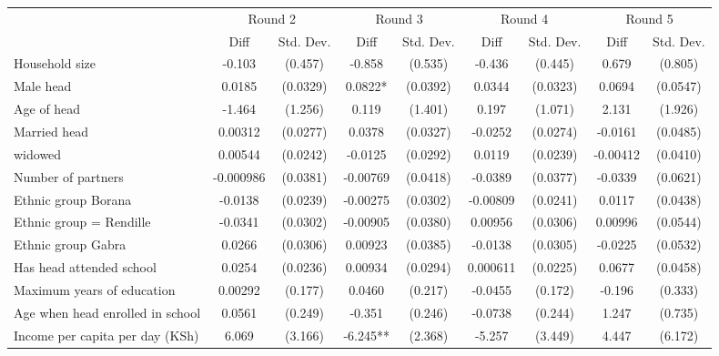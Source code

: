 \begin{tabular}{l*{4}{cc}}
\toprule
            &\multicolumn{2}{c}{Round 2} &\multicolumn{2}{c}{Round 3} &\multicolumn{2}{c}{Round 4} &\multicolumn{2}{c}{Round 5} \\
            &        Diff   &   Std. Dev.&        Diff   &   Std. Dev.&        Diff   &   Std. Dev.&        Diff   &   Std. Dev.\\
\midrule
Household size&      -0.103   &     (0.457)&      -0.858   &     (0.535)&      -0.436   &     (0.445)&       0.679   &     (0.805)\\
Male head   &      0.0185   &    (0.0329)&      0.0822*  &    (0.0392)&      0.0344   &    (0.0323)&      0.0694   &    (0.0547)\\
Age of head &      -1.464   &     (1.256)&       0.119   &     (1.401)&       0.197   &     (1.071)&       2.131   &     (1.926)\\
Married head&     0.00312   &    (0.0277)&      0.0378   &    (0.0327)&     -0.0252   &    (0.0274)&     -0.0161   &    (0.0485)\\
widowed     &     0.00544   &    (0.0242)&     -0.0125   &    (0.0292)&      0.0119   &    (0.0239)&    -0.00412   &    (0.0410)\\
Number of partners&   -0.000986   &    (0.0381)&    -0.00769   &    (0.0418)&     -0.0389   &    (0.0377)&     -0.0339   &    (0.0621)\\
Ethnic group Borana&     -0.0138   &    (0.0239)&    -0.00275   &    (0.0302)&    -0.00809   &    (0.0241)&      0.0117   &    (0.0438)\\
Ethnic group = Rendille &     -0.0341   &    (0.0302)&    -0.00905   &    (0.0380)&     0.00956   &    (0.0306)&     0.00996   &    (0.0544)\\
Ethnic group Gabra&      0.0266   &    (0.0306)&     0.00923   &    (0.0385)&     -0.0138   &    (0.0305)&     -0.0225   &    (0.0532)\\
Has head attended school&      0.0254   &    (0.0236)&     0.00934   &    (0.0294)&    0.000611   &    (0.0225)&      0.0677   &    (0.0458)\\
Maximum years of education&     0.00292   &     (0.177)&      0.0460   &     (0.217)&     -0.0455   &     (0.172)&      -0.196   &     (0.333)\\
Age when head enrolled in school&      0.0561   &     (0.249)&      -0.351   &     (0.246)&     -0.0738   &     (0.244)&       1.247   &     (0.735)\\
Income per capita per day (KSh)&       6.069   &     (3.166)&      -6.245** &     (2.368)&      -5.257   &     (3.449)&       4.447   &     (6.172)\\

\end{tabular}
